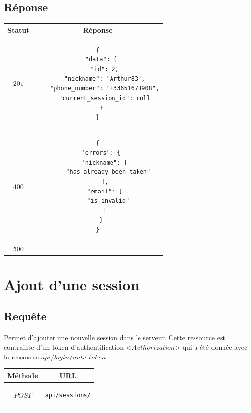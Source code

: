 \documentclass[titlepage, 12pt]{report}
\begin{document}
\subsection{Réponse}

\begin{center}
	\begin{tabular}{|c|c|}
		\hline
		Statut & Réponse \\
		\hline
		$ 201 $ & \begin{lstlisting}
{
  "data": {
    "id": 2,
    "nickname": "Arthur83",
    "phone_number": "+33651678908",
    "current_session_id": null
  }
}
\end{lstlisting} \\ 
\hline
$ 400 $ & \begin{lstlisting}
{
  "errors": {
    "nickname": [
      "has already been taken"
    ],
    "email": [
      "is invalid"
    ]
  }
}
		\end{lstlisting} \\
		\hline
		$ 500 $ & \\
		\hline
	\end{tabular}
\end{center}

%
%

\section{Ajout d'une session}

\subsection{Requête}

\paragraph{} Permet d'ajouter une nouvelle session dans le serveur. Cette ressource est contrainte d'un token d'authentification <$Authorization$> qui a été donnée avec la ressource $api/login/auth\_token$

\begin{center}
	\begin{tabular}{|c|c|}
	\hline
	Méthode & URL \\
	\hline
	$ POST $ 
	&
	\begin{lstlisting}
api/sessions/
	\end{lstlisting} 
	\\ \hline
	\end{tabular}
\end{center}
\end{document}
